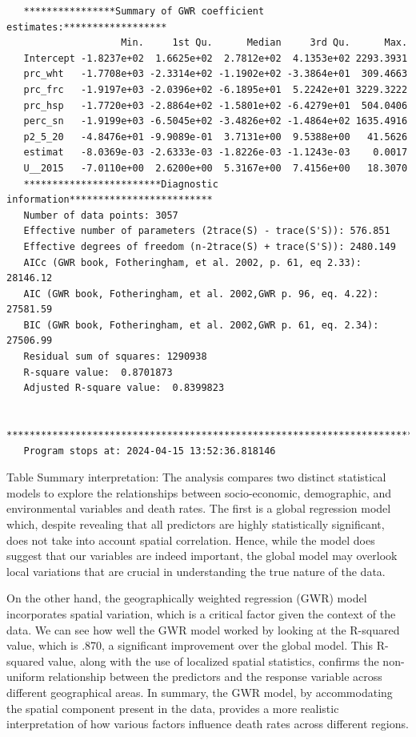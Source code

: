 \documentclass[
]{article}
\begin{document}
\begin{verbatim}
   ****************Summary of GWR coefficient estimates:******************
                    Min.     1st Qu.      Median     3rd Qu.      Max.
   Intercept -1.8237e+02  1.6625e+02  2.7812e+02  4.1353e+02 2293.3931
   prc_wht   -1.7708e+03 -2.3314e+02 -1.1902e+02 -3.3864e+01  309.4663
   prc_frc   -1.9197e+03 -2.0396e+02 -6.1895e+01  5.2242e+01 3229.3222
   prc_hsp   -1.7720e+03 -2.8864e+02 -1.5801e+02 -6.4279e+01  504.0406
   perc_sn   -1.9199e+03 -6.5045e+02 -3.4826e+02 -1.4864e+02 1635.4916
   p2_5_20   -4.8476e+01 -9.9089e-01  3.7131e+00  9.5388e+00   41.5626
   estimat   -8.0369e-03 -2.6333e-03 -1.8226e-03 -1.1243e-03    0.0017
   U__2015   -7.0110e+00  2.6200e+00  5.3167e+00  7.4156e+00   18.3070
   ************************Diagnostic information*************************
   Number of data points: 3057 
   Effective number of parameters (2trace(S) - trace(S'S)): 576.851 
   Effective degrees of freedom (n-2trace(S) + trace(S'S)): 2480.149 
   AICc (GWR book, Fotheringham, et al. 2002, p. 61, eq 2.33): 28146.12 
   AIC (GWR book, Fotheringham, et al. 2002,GWR p. 96, eq. 4.22): 27581.59 
   BIC (GWR book, Fotheringham, et al. 2002,GWR p. 61, eq. 2.34): 27506.99 
   Residual sum of squares: 1290938 
   R-square value:  0.8701873 
   Adjusted R-square value:  0.8399823 

   ***********************************************************************
   Program stops at: 2024-04-15 13:52:36.818146 
\end{verbatim}

Table Summary interpretation: The analysis compares two distinct
statistical models to explore the relationships between socio-economic,
demographic, and environmental variables and death rates. The first is a
global regression model which, despite revealing that all predictors are
highly statistically significant, does not take into account spatial
correlation. Hence, while the model does suggest that our variables are
indeed important, the global model may overlook local variations that
are crucial in understanding the true nature of the data.~

On the other hand, the geographically weighted regression (GWR) model
incorporates spatial variation, which is a critical factor given the
context of the data. We can see how well the GWR model worked by looking
at the R-squared value, which is .870, a significant improvement over
the global model. This R-squared value, along with the use of localized
spatial statistics, confirms the non-uniform relationship between the
predictors and the response variable across different geographical
areas. In summary, the GWR model, by accommodating the spatial component
present in the data, provides a more realistic interpretation of how
various factors influence death rates across different regions.
\end{document}
